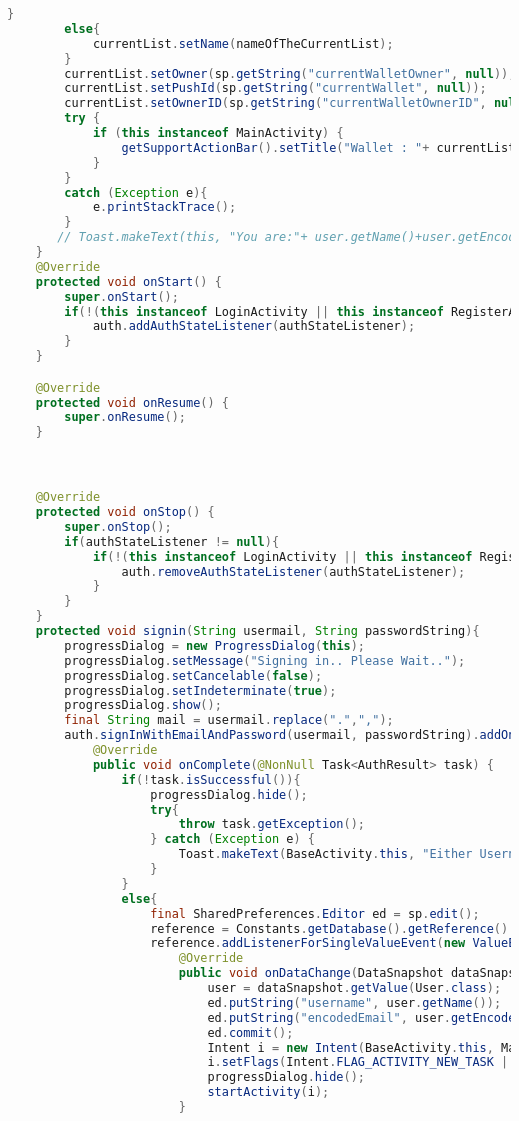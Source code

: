 \documentclass{article}
\begin{document}
\begin{lstlisting}[language=Java]
        }
        else{
            currentList.setName(nameOfTheCurrentList);
        }
        currentList.setOwner(sp.getString("currentWalletOwner", null));
        currentList.setPushId(sp.getString("currentWallet", null));
        currentList.setOwnerID(sp.getString("currentWalletOwnerID", null));
        try {
            if (this instanceof MainActivity) {
                getSupportActionBar().setTitle("Wallet : "+ currentList.getName());
            }
        }
        catch (Exception e){
            e.printStackTrace();
        }
       // Toast.makeText(this, "You are:"+ user.getName()+user.getEncodedEmail(), Toast.LENGTH_LONG).show();
    }
    @Override
    protected void onStart() {
        super.onStart();
        if(!(this instanceof LoginActivity || this instanceof RegisterActivity)){
            auth.addAuthStateListener(authStateListener);
        }
    }

    @Override
    protected void onResume() {
        super.onResume();
    }



    @Override
    protected void onStop() {
        super.onStop();
        if(authStateListener != null){
            if(!(this instanceof LoginActivity || this instanceof RegisterActivity)) {
                auth.removeAuthStateListener(authStateListener);
            }
        }
    }
    protected void signin(String usermail, String passwordString){
        progressDialog = new ProgressDialog(this);
        progressDialog.setMessage("Signing in.. Please Wait..");
        progressDialog.setCancelable(false);
        progressDialog.setIndeterminate(true);
        progressDialog.show();
        final String mail = usermail.replace(".",",");
        auth.signInWithEmailAndPassword(usermail, passwordString).addOnCompleteListener(this, new OnCompleteListener<AuthResult>() {
            @Override
            public void onComplete(@NonNull Task<AuthResult> task) {
                if(!task.isSuccessful()){
                    progressDialog.hide();
                    try{
                        throw task.getException();
                    } catch (Exception e) {
                        Toast.makeText(BaseActivity.this, "Either Username or password is wrong",Toast.LENGTH_LONG).show();
                    }
                }
                else{
                    final SharedPreferences.Editor ed = sp.edit();
                    reference = Constants.getDatabase().getReference().child("users").child(mail);
                    reference.addListenerForSingleValueEvent(new ValueEventListener() {
                        @Override
                        public void onDataChange(DataSnapshot dataSnapshot) {
                            user = dataSnapshot.getValue(User.class);
                            ed.putString("username", user.getName());
                            ed.putString("encodedEmail", user.getEncodedEmail());
                            ed.commit();
                            Intent i = new Intent(BaseActivity.this, MainActivity.class);
                            i.setFlags(Intent.FLAG_ACTIVITY_NEW_TASK | Intent.FLAG_ACTIVITY_CLEAR_TASK);
                            progressDialog.hide();
                            startActivity(i);
                        }


\end{lstlisting}
\end{document}
